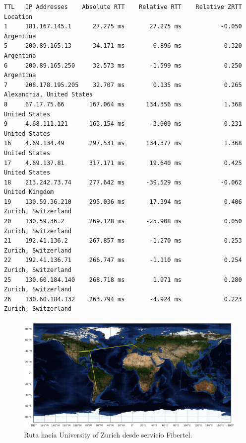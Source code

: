 \documentclass[10pt, a4paper]{article}
\begin{document}
\begin{verbatim}
TTL   IP Addresses    Absolute RTT    Relative RTT    Relative ZRTT  Location
1     181.167.145.1      27.275 ms       27.275 ms           -0.050  Argentina
5     200.89.165.13      34.171 ms        6.896 ms            0.320  Argentina
6     200.89.165.250     32.573 ms       -1.599 ms            0.250  Argentina
7     208.178.195.205    32.707 ms        0.135 ms            0.265  Alexandria, United States
8     67.17.75.66       167.064 ms      134.356 ms            1.368  United States
9     4.68.111.121      163.154 ms       -3.909 ms            0.231  United States
16    4.69.134.49       297.531 ms      134.377 ms            1.368  United States
17    4.69.137.81       317.171 ms       19.640 ms            0.425  United States
18    213.242.73.74     277.642 ms      -39.529 ms           -0.062  United Kingdom
19    130.59.36.210     295.036 ms       17.394 ms            0.406  Zurich, Switzerland
20    130.59.36.2       269.128 ms      -25.908 ms            0.050  Zurich, Switzerland
21    192.41.136.2      267.857 ms       -1.270 ms            0.253  Zurich, Switzerland
22    192.41.136.71     266.747 ms       -1.110 ms            0.254  Zurich, Switzerland
25    130.60.184.140    268.718 ms        1.971 ms            0.280  Zurich, Switzerland
26    130.60.184.132    263.794 ms       -4.924 ms            0.223  Zurich, Switzerland

\end{verbatim}

\begin{figure}[H] %
\begin{center}
\includegraphics[width=400pt]{../imgs/map-uzh.png}
\caption{Ruta hacia University of Zurich desde servicio Fibertel.}
\end{center}
\end{figure}
\end{document}
